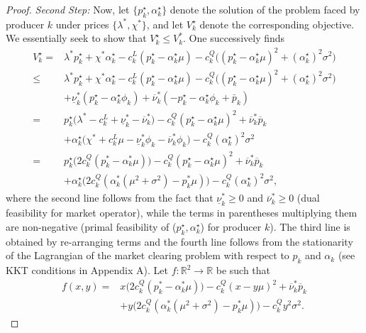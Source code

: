 \documentclass{article}
\begin{document}
\begin{proof}
\textit{Second Step:} Now, let $\{p_k^\star, \alpha_k^\star\}$ denote the solution of the problem faced by producer $k$ under prices $\{\lambda^*, \chi^*\}$, and let $V_k^\star$ denote the corresponding objective. We essentially seek to show that $V_k^\star \le V_k^*$. One successively finds
\begin{align*}
    V_k^\star =& \lambda^*p_k^\star + \chi^* \alpha_k^\star - c_k^L(p_k^\star - \alpha_k^\star \mu) - c_k^Q\big((p_k^\star - \alpha_k^\star \mu)^2 + (\alpha_k^\star)^2\sigma^2\big)\\
    \le& \lambda^*p_k^\star + \chi^* \alpha_k^\star - c_k^L(p_k^\star - \alpha_k^\star \mu) - c_k^Q\big((p_k^\star - \alpha_k^\star \mu)^2 + (\alpha_k^\star)^2\sigma^2\big)\\
    &+ \underline{\nu}_k^* (p_k^\star - \alpha_k^\star \phi_k) + \overline{\nu}_k^*(-p_k^\star - \alpha_k^\star \phi_k + \bar{p}_k)\\
    =& p_k^\star\big(\lambda^* - c_k^L + \underline{\nu}_k^* - \overline{\nu}_k^*\big) - c_k^Q(p_k^\star - \alpha_k^\star \mu)^2 + \overline{\nu}_k^* \overline{p}_k\\
    &+ \alpha_k^\star\big(\chi^* + c_k^L \mu - \underline{\nu}_k^* \phi_k - \overline{\nu}_k^* \phi_k\big) - c_k^Q (\alpha_k^\star)^2 \sigma^2 \\
   =& p_k^\star\big(2c_k^Q(p_k^* - \alpha_k^* \mu)\big) - c_k^Q(p_k^\star - \alpha_k^\star \mu)^2 + \overline{\nu}_k^* \overline{p}_k\\ 
    &+ \alpha_k^\star\big(2c_k^Q(\alpha_k^*(\mu^2+\sigma^2) - p_k^* \mu)\big) - c_k^Q (\alpha_k^\star)^2 \sigma^2,
\end{align*}
where the second line follows from the fact that $\underline{\nu}_k^* \ge 0$ and $\overline{\nu}_k^* \ge 0$ (dual feasibility for market operator), while the terms in parentheses multiplying them are non-negative (primal feasibility of ($p_k^\star, \alpha_k^\star$) for producer $k$). The third line is obtained by re-arranging terms and the fourth line follows from the stationarity of the Lagrangian of the market clearing problem with respect to $p_k$ and $\alpha_k$ (see KKT conditions in Appendix A). Let $f:\mathbb{R}^2 \rightarrow \mathbb{R}$ be such that
\begin{align*}
f(x, y) =& x \big(2c_k^Q(p_k^* - \alpha_k^* \mu)\big) - c_k^Q(x - y \mu)^2 + \overline{\nu}_k^* \overline{p}_k\\ 
    &+ y \big(2c_k^Q(\alpha_k^*(\mu^2+\sigma^2) - p_k^* \mu)\big) - c_k^Q y^2 \sigma^2.
\end{align*}

\end{proof}
\end{document}

